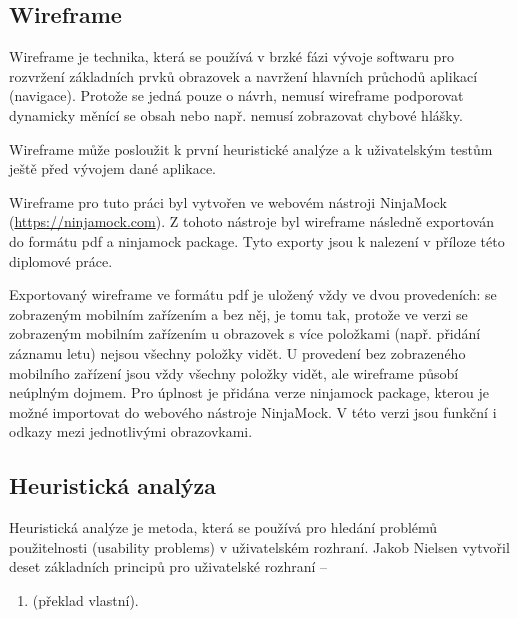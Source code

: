 \documentclass[thesis=M,czech]{FITthesis}[2012/06/26]
\begin{document}
\subsection{Wireframe}
Wireframe je technika, která se používá v brzké fázi vývoje softwaru \cite{nngWireframe} pro rozvržení základních prvků obrazovek a navržení hlavních průchodů aplikací (navigace). Protože se jedná pouze o návrh, nemusí wireframe podporovat dynamicky měnící se obsah nebo např. nemusí zobrazovat chybové hlášky.

Wireframe může posloužit k první heuristické analýze a k uživatelským testům ještě před vývojem dané aplikace. \cite{exux}

Wireframe pro tuto práci byl vytvořen ve webovém nástroji NinjaMock (\url{https://ninjamock.com}). Z tohoto nástroje byl wireframe následně exportován do formátu pdf a ninjamock package. Tyto exporty jsou k nalezení v příloze této diplomové práce. 

Exportovaný wireframe ve formátu pdf je uložený vždy ve dvou provedeních: se zobrazeným mobilním zařízením a bez něj, je tomu tak, protože ve verzi se zobrazeným mobilním zařízením u obrazovek s více položkami (např. přidání záznamu letu) nejsou všechny položky vidět. U provedení bez zobrazeného mobilního zařízení jsou vždy všechny položky vidět, ale wireframe působí neúplným dojmem. Pro úplnost je přidána verze ninjamock package, kterou je možné importovat do webového nástroje NinjaMock. V této verzi jsou funkční i odkazy mezi jednotlivými obrazovkami. 

\subsection{Heuristická analýza}
Heuristická analýze je metoda, která se používá pro hledání problémů použitelnosti (usability problems) v uživatelském rozhraní. \cite{howtoheuristic} Jakob Nielsen vytvořil deset základních principů pro uživatelské rozhraní --
\begin{enumerate}
 \item {} \cite{10heuristics} (překlad vlastní).
\end{enumerate}
\end{document}
